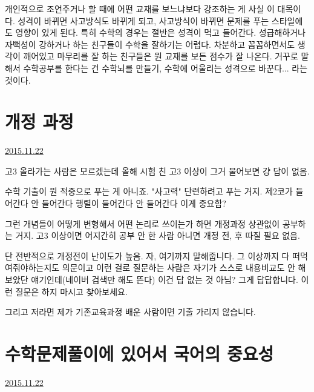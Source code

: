 개인적으로 조언주거나 할 때에 어떤 교재를 보느냐보다 강조하는 게 사실 이 대목이다.
성격이 바뀌면 사고방식도 바뀌게 되고, 사고방식이 바뀌면 문제를 푸는 스타일에도 영향이 있게 된다.
특히 수학의 경우는 절반은 성격이 먹고 들어간다. 성급해하거나 자뻑성이 강하거나 하는 친구들이 수학을 잘하기는 어렵다.
차분하고 꼼꼼하면서도 생각이 깨어있고 마무리를 잘 하는 친구들은 뭔 교재를 보든 점수가 잘 나온다.
거꾸로 말해서 수학공부를 한다는 건 수학뇌를 만들기, 수학에 어울리는 성격으로 바꾼다... 라는 것이다.
\vspace{5mm}





\section{개정 과정}
\href{https://www.kockoc.com/Apoc/505123}{2015.11.22}

\vspace{5mm}

고3 올라가는 사람은 모르겠는데
올해 시험 친 고3 이상이 그거 물어보면 걍 답이 없음.
\vspace{5mm}

수학 기출이 뭔 적중으로 푸는 게 아니죠. "사고력" 단련하려고 푸는 거지.
제2코가 들어간다 안 들어간다 행렬이 들어간다 안 들어간다 이게 중요함?
\vspace{5mm}

그런 개념들이 어떻게 변형해서 어떤 논리로 쓰이는가 하면 개정과정 상관없이 공부하는 거지.
고3 이상이면 어지간히 공부 안 한 사람 아니면 개정 전, 후 따질 필요 없음.
\vspace{5mm}

단 전반적으로 개정전이 난이도가 높음. 자, 여기까지 말해줍니다. 그 이상까지 다 떠먹여줘야하는지도 의문이고
이런 걸로 질문하는 사람은 자기가 스스로 내용비교도 안 해보았단 얘기인데(네이버 검색만 해도 뜬다) 이건 답 없는 것 아님?
그게 답답합니다. 이런 질문은 하지 마시고 찾아보세요.
\vspace{5mm}

그리고 저라면 제가 기존교육과정 배운 사람이면 기출 가리지 않습니다.
\vspace{5mm}




\section{수학문제풀이에 있어서 국어의 중요성}
\href{https://www.kockoc.com/Apoc/505651}{2015.11.22}

\vspace{5mm}

